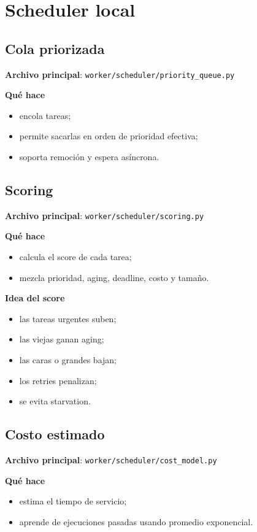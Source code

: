 \documentclass[11pt]{article}
\begin{document}
\section{Scheduler local}

\subsection{Cola priorizada}
\textbf{Archivo principal}: \texttt{worker/scheduler/priority\_queue.py}

\textbf{Qué hace}
\begin{itemize}
\item encola tareas;
\item permite sacarlas en orden de prioridad efectiva;
\item soporta remoción y espera asíncrona.
\end{itemize}

\subsection{Scoring}
\textbf{Archivo principal}: \texttt{worker/scheduler/scoring.py}

\textbf{Qué hace}
\begin{itemize}
\item calcula el score de cada tarea;
\item mezcla prioridad, aging, deadline, costo y tamaño.
\end{itemize}

\textbf{Idea del score}
\begin{itemize}
\item las tareas urgentes suben;
\item las viejas ganan aging;
\item las caras o grandes bajan;
\item los retries penalizan;
\item se evita starvation.
\end{itemize}

\subsection{Costo estimado}
\textbf{Archivo principal}: \texttt{worker/scheduler/cost\_model.py}

\textbf{Qué hace}
\begin{itemize}
\item estima el tiempo de servicio;
\item aprende de ejecuciones pasadas usando promedio exponencial.
\end{itemize}
\end{document}
